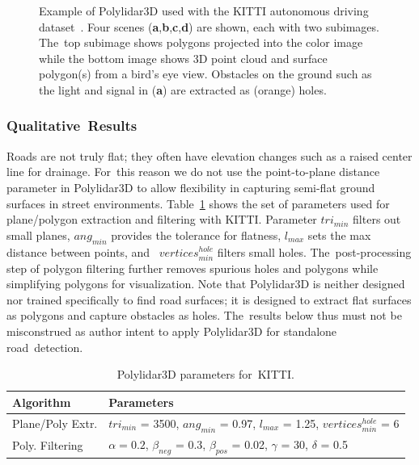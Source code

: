 \begin{figure}[ht]
  \caption[Example of Polylidar3D used with the KITTI autonomous driving dataset]{Example of Polylidar3D used with the KITTI autonomous driving dataset~\cite{geiger_vision_2013}. Four scenes (\textbf{a},\textbf{b},\textbf{c},\textbf{d}) are shown, each with two subimages. The~top subimage shows polygons projected into the color image while the bottom image shows 3D point cloud and surface polygon(s) from a bird's eye view. Obstacles on the ground such as the light and signal in (\textbf{a}) are extracted as (orange) holes. }\label{fig:ch3_kitti}
\end{figure}


\subsubsection{Qualitative~Results}\label{sec:ch3_results_kitti_qual}

Roads are not truly flat; they often have elevation changes such as a raised center line for drainage. For~this reason we do not use the point-to-plane distance parameter in Polylidar3D to allow flexibility in capturing semi-flat ground surfaces in street environments. Table~\ref{table:ch3_kitti_parameters} shows the set of parameters used for plane/polygon extraction and filtering with KITTI. Parameter $tri_{min}$ filters out small planes, $ang_{min}$ provides the tolerance for flatness, $l_{max}$ sets the max distance between points, and~ $vertices^{hole}_{min}$ filters small holes. The~post-processing step of polygon filtering further removes spurious holes and polygons while simplifying polygons for visualization. Note that Polylidar3D is neither designed nor trained specifically to find road surfaces; it is designed to extract flat surfaces as polygons and capture obstacles as holes. The~results below thus must not be misconstrued as author intent to apply Polylidar3D for standalone road~detection. 

\begin{table}[H]
\centering
\caption{Polylidar3D parameters for~KITTI.}\label{table:ch3_kitti_parameters}
\begin{tabular}{@{}ll@{}}
\toprule
\textbf{Algorithm}        & \textbf{Parameters}                                                          \\ \midrule
Plane/Poly Extr.      & $tri_{min}$ = 3500, $ang_{min}$ = 0.97, $l_{max}$ = 1.25, $vertices^{hole}_{min}$ = 6      \\
Poly. Filtering      & $\alpha = 0.2$, $\beta_{neg}$ = 0.3, $\beta_{pos}$ = 0.02, $\gamma$ = 30, $\delta$ = 0.5      \\ \bottomrule
\end{tabular}
\end{table}


